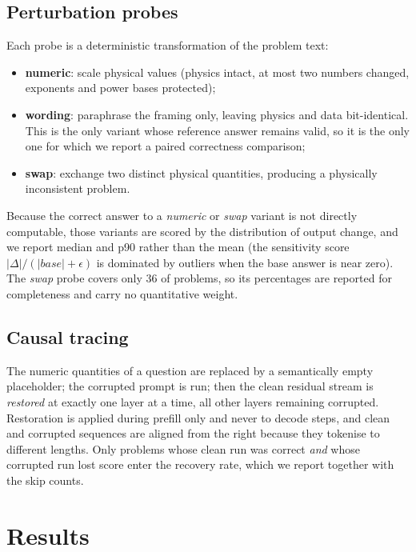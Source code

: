\documentclass[10pt,letterpaper]{article}
\begin{document}
\subsection{Perturbation probes}
Each probe is a deterministic transformation of the problem text:
\begin{itemize}
  \item \textbf{numeric}: scale physical values (physics intact, at most two
        numbers changed, exponents and power bases protected);
  \item \textbf{wording}: paraphrase the framing only, leaving physics and data
        bit-identical. This is the only variant whose reference answer remains
        valid, so it is the only one for which we report a paired correctness
        comparison;
  \item \textbf{swap}: exchange two distinct physical quantities, producing a
        physically inconsistent problem.
\end{itemize}
Because the correct answer to a \emph{numeric} or \emph{swap} variant is not
directly computable, those variants are scored by the distribution of output
change, and we report median and p90 rather than the mean (the sensitivity score
$|\Delta|/(|base|+\epsilon)$ is dominated by outliers when the base answer is near
zero). The \emph{swap} probe covers only 36 of \nbSciBench{} problems, so its
percentages are reported for completeness and carry no quantitative weight.

\subsection{Causal tracing}
The numeric quantities of a question are replaced by a semantically empty
placeholder; the corrupted prompt is run; then the clean residual stream is
\emph{restored} at exactly one layer at a time, all other layers remaining
corrupted. Restoration is applied during prefill only and never to decode steps,
and clean and corrupted sequences are aligned from the right because they
tokenise to different lengths. Only problems whose clean run was correct
\emph{and} whose corrupted run lost score enter the recovery rate, which we report
together with the skip counts.

\section{Results}
\label{sec:results}
\end{document}
